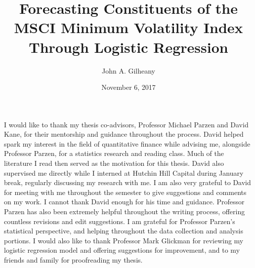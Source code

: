 \documentclass[12pt,twoside]{reedthesis}
\title{Forecasting Constituents of the MSCI Minimum Volatility Index Through
Logistic Regression}
\author{John A. Gilheany}
\date{November 6, 2017}
\theoremstyle{definition}
\theoremstyle{definition}
\theoremstyle{definition}
\theoremstyle{remark}
\begin{document}
  \maketitle

\frontmatter %
\pagestyle{empty} %
  \begin{acknowledgements}
    I would like to thank my thesis co-advisors, Professor Michael Parzen
    and David Kane, for their mentorship and guidance throughout the
    process. David helped spark my interest in the field of quantitative
    finance while advising me, alongside Professor Parzen, for a statistics
    research and reading class. Much of the literature I read then served as
    the motivation for this thesis. David also supervised me directly while
    I interned at Hutchin Hill Capital during January break, regularly
    discussing my research with me. I am also very grateful to David for
    meeting with me throughout the semester to give suggestions and comments
    on my work. I cannot thank David enough for his time and guidance.
    Professor Parzen has also been extremely helpful throughout the writing
    process, offering countless revisions and edit suggestions. I am
    grateful for Professor Parzen's statistical perspective, and helping
    throughout the data collection and analysis portions. I would also like
    to thank Professor Mark Glickman for reviewing my logistic regression
    model and offering suggestions for improvement, and to my friends and
    family for proofreading my thesis.
  \end{acknowledgements}

  \hypersetup{linkcolor=black}
  \setcounter{tocdepth}{2}
  \tableofcontents

  \listoftables
\end{document}
